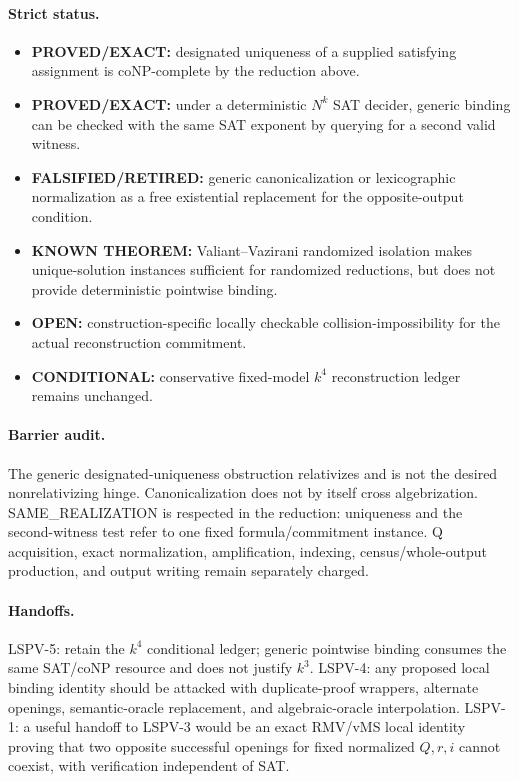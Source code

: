 \documentclass[11pt]{article}
\begin{document}
\paragraph{Strict status.}
\begin{itemize}
\item \textbf{PROVED/EXACT:} designated uniqueness of a supplied satisfying assignment is coNP-complete by the reduction above.
\item \textbf{PROVED/EXACT:} under a deterministic $N^k$ SAT decider, generic binding can be checked with the same SAT exponent by querying for a second valid witness.
\item \textbf{FALSIFIED/RETIRED:} generic canonicalization or lexicographic normalization as a free existential replacement for the opposite-output condition.
\item \textbf{KNOWN THEOREM:} Valiant--Vazirani randomized isolation makes unique-solution instances sufficient for randomized reductions, but does not provide deterministic pointwise binding.
\item \textbf{OPEN:} construction-specific locally checkable collision-impossibility for the actual reconstruction commitment.
\item \textbf{CONDITIONAL:} conservative fixed-model $k^4$ reconstruction ledger remains unchanged.
\end{itemize}

\paragraph{Barrier audit.}
The generic designated-uniqueness obstruction relativizes and is not the desired nonrelativizing hinge. Canonicalization does not by itself cross algebrization. SAME\_REALIZATION is respected in the reduction: uniqueness and the second-witness test refer to one fixed formula/commitment instance. Q acquisition, exact normalization, amplification, indexing, census/whole-output production, and output writing remain separately charged.

\paragraph{Handoffs.}
LSPV-5: retain the $k^4$ conditional ledger; generic pointwise binding consumes the same SAT/coNP resource and does not justify $k^3$.
LSPV-4: any proposed local binding identity should be attacked with duplicate-proof wrappers, alternate openings, semantic-oracle replacement, and algebraic-oracle interpolation.
LSPV-1: a useful handoff to LSPV-3 would be an exact RMV/vMS local identity proving that two opposite successful openings for fixed normalized $Q,r,i$ cannot coexist, with verification independent of SAT.
\end{document}
